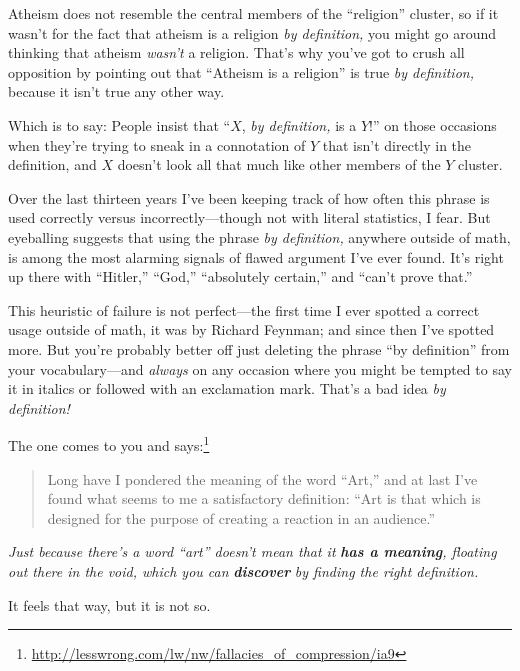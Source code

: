 { Atheism does not resemble the central members of the
``religion'' cluster, so if it
wasn't for the fact that atheism is a religion
\textit{by definition,} you might go around thinking that atheism
\textit{wasn't} a religion. That's why
you've got to crush all opposition by pointing out that
``Atheism is a religion'' is true
\textit{by definition,} because it isn't true any other
way.


 Which is to say: People insist that ``$X$,
\textit{by definition,} is a $Y$!'' on those occasions
when they're trying to sneak in a connotation of $Y$ that
isn't directly in the definition, and $X$
doesn't look all that much like other members of the $Y$
cluster.


 Over the last thirteen years I've been keeping
track of how often this phrase is used correctly versus
incorrectly---though not with literal statistics, I fear. But
eyeballing suggests that using the phrase \textit{by definition,}
anywhere outside of math, is among the most alarming signals of flawed
argument I've ever found. It's right up
there with ``Hitler,''
``God,''
``absolutely certain,'' and
``can't prove
that.''


 This heuristic of failure is not perfect---the first time I ever
spotted a correct usage outside of math, it was by Richard Feynman; and
since then I've spotted more. But
you're probably better off just deleting the phrase
``by definition'' from your
vocabulary---and \textit{always} on any occasion where you might be
tempted to say it in italics or followed with an exclamation mark.
That's a bad idea \textit{by definition!}

\myendsectiontext



 The one comes to you and says:\footnote{\url{http://lesswrong.com/lw/nw/fallacies_of_compression/ia9}}

\begin{quote}
{
 Long have I pondered the meaning of the word
``Art,'' and at last
I've found what seems to me a satisfactory definition:
``Art is that which is designed for the purpose of
creating a reaction in an audience.''}
\end{quote}

{
 \textit{Just because there's a word
``art'' doesn't mean
that it }\textbf{\textit{has a meaning}}\textit{, floating out there in
the void, which you can }\textbf{\textit{discover}}\textit{ by finding
the right definition.}}


 It feels that way, but it is not so.


}
